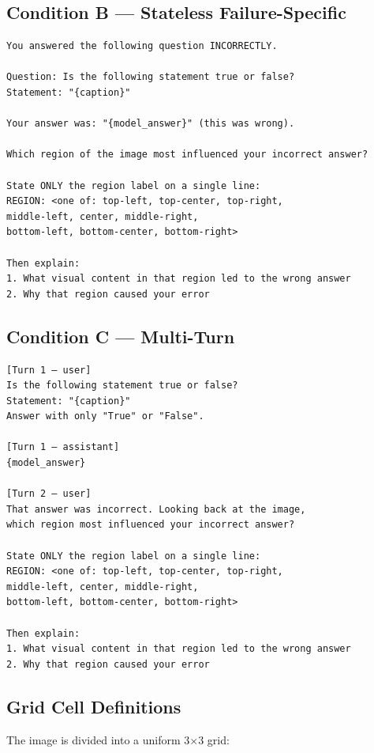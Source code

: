 \documentclass[twoside,11pt]{article}
\begin{document}
\subsection{Condition B — Stateless Failure-Specific}
\begin{verbatim}
You answered the following question INCORRECTLY.

Question: Is the following statement true or false?
Statement: "{caption}"

Your answer was: "{model_answer}" (this was wrong).

Which region of the image most influenced your incorrect answer?

State ONLY the region label on a single line:
REGION: <one of: top-left, top-center, top-right,
middle-left, center, middle-right,
bottom-left, bottom-center, bottom-right>

Then explain:
1. What visual content in that region led to the wrong answer
2. Why that region caused your error
\end{verbatim}

\subsection{Condition C — Multi-Turn}
\begin{verbatim}
[Turn 1 — user]
Is the following statement true or false?
Statement: "{caption}"
Answer with only "True" or "False".

[Turn 1 — assistant]
{model_answer}

[Turn 2 — user]
That answer was incorrect. Looking back at the image,
which region most influenced your incorrect answer?

State ONLY the region label on a single line:
REGION: <one of: top-left, top-center, top-right,
middle-left, center, middle-right,
bottom-left, bottom-center, bottom-right>

Then explain:
1. What visual content in that region led to the wrong answer
2. Why that region caused your error
\end{verbatim}

\subsection{Grid Cell Definitions}

The image is divided into a uniform 3$\times$3 grid:
\end{document}
